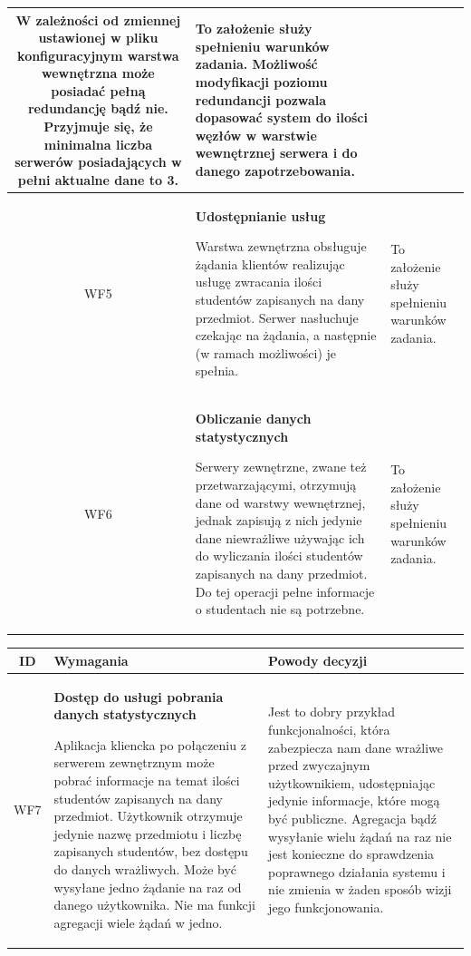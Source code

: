 {\begin{tabularx}{\textwidth}{|c|X|X|}
W zależności od zmiennej ustawionej w pliku konfiguracyjnym warstwa wewnętrzna może posiadać pełną redundancję bądź nie. Przyjmuje się, że minimalna liczba serwerów posiadających w pełni aktualne dane to 3. & To założenie służy spełnieniu warunków zadania. Możliwość modyfikacji poziomu redundancji pozwala dopasować system do ilości węzłów w warstwie wewnętrznej serwera i do danego zapotrzebowania.\\
\hline

\label{z:WF5} WF5 & \textbf{Udostępnianie usług }

 Warstwa zewnętrzna obsługuje żądania klientów realizując usługę zwracania ilości studentów zapisanych na dany przedmiot. Serwer nasłuchuje czekając na żądania, a następnie (w ramach możliwości) je spełnia. & To założenie służy spełnieniu warunków zadania. \\
\hline



\label{z:WF6} WF6 & \textbf{Obliczanie danych statystycznych }

  Serwery zewnętrzne, zwane też przetwarzającymi, otrzymują dane od warstwy wewnętrznej, jednak zapisują z nich jedynie dane niewrażliwe używając ich do wyliczania ilości studentów zapisanych na dany przedmiot. Do tej operacji pełne informacje o studentach nie są potrzebne. & 
To założenie służy spełnieniu warunków zadania. \\
\hline

\end{tabularx}
\newpage
\begin{tabularx}{\textwidth}{|c|X|X|}
\hline
\textbf{ID} & \textbf{Wymagania}  & \textbf{Powody decyzji} \\
\hline

\label{z:WF7} WF7 & \textbf{Dostęp do usługi pobrania danych statystycznych} 
 
Aplikacja kliencka po połączeniu z serwerem zewnętrznym może pobrać informacje na temat ilości studentów zapisanych na dany przedmiot. Użytkownik otrzymuje jedynie nazwę przedmiotu i liczbę zapisanych studentów, bez dostępu do danych wrażliwych. Może być wysyłane jedno żądanie na raz od danego użytkownika. Nie ma funkcji agregacji wiele żądań w jedno. & 
Jest to dobry przykład funkcjonalności, która zabezpiecza nam dane wrażliwe przed zwyczajnym użytkownikiem, udostępniając jedynie informacje, które mogą być publiczne. Agregacja bądź wysyłanie wielu żądań na raz nie jest konieczne do sprawdzenia poprawnego działania systemu i nie zmienia w żaden sposób wizji jego funkcjonowania.\\
\hline




\end{tabularx}}
